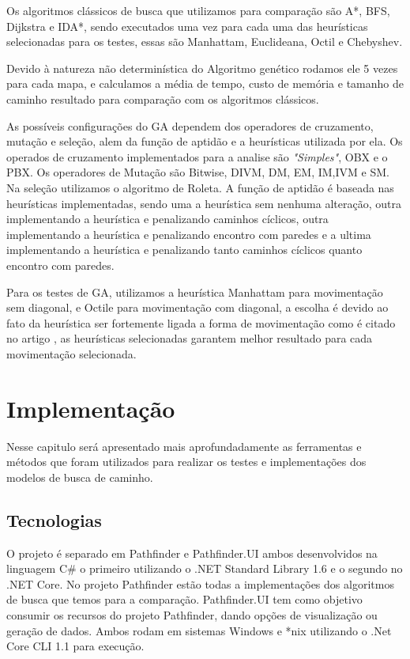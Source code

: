 Os algoritmos clássicos de busca que utilizamos para comparação são A\**, BFS, Dijkstra e IDA*, sendo executados uma vez para cada uma das heurísticas selecionadas para os testes, essas são Manhattam, Euclideana, Octil e Chebyshev.
  
Devido à natureza não determinística do Algoritmo genético rodamos ele 5 vezes para cada mapa, e calculamos a média de tempo, custo de memória e tamanho de caminho resultado para comparação com os algoritmos clássicos.
 
As possíveis configurações do GA dependem dos operadores de cruzamento, mutação e seleção, alem da função de aptidão e a heurísticas utilizada por ela. Os operados de cruzamento implementados para a analise são \textit{"Simples"}, OBX e o PBX. Os operadores de Mutação são Bitwise, DIVM, DM, EM, IM,IVM e SM. Na seleção utilizamos o algoritmo de Roleta. A função de aptidão é baseada nas heurísticas implementadas, sendo uma a heurística sem nenhuma alteração, outra implementando a heurística e penalizando caminhos cíclicos, outra implementando a heurística e penalizando encontro com paredes e a ultima implementando a heurística e penalizando tanto caminhos cíclicos quanto encontro com paredes.
 
Para os testes de GA, utilizamos a heurística Manhattam para movimentação sem diagonal, e Octile para movimentação com diagonal, a escolha é devido ao fato da heurística ser fortemente ligada a forma de movimentação como é citado no artigo \cite{GameProgrammingHeuristics}, as heurísticas selecionadas garantem melhor resultado para cada movimentação selecionada.
 
\chapter[Implementação]{Implementação}
 
Nesse capitulo será apresentado mais aprofundadamente as ferramentas e métodos que foram utilizados para realizar os testes  e implementações dos modelos de busca de caminho.
 
 \section{Tecnologias}
 O projeto é separado em Pathfinder e Pathfinder.UI ambos desenvolvidos na linguagem C\# o primeiro utilizando o .NET Standard Library 1.6 e o segundo no .NET Core. No projeto Pathfinder estão todas a  implementações dos algoritmos de busca que temos para a comparação. Pathfinder.UI tem como objetivo consumir os recursos do projeto Pathfinder, dando opções de visualização ou geração de dados. Ambos rodam em sistemas Windows e \**nix utilizando o .Net Core CLI 1.1 para execução.
 
